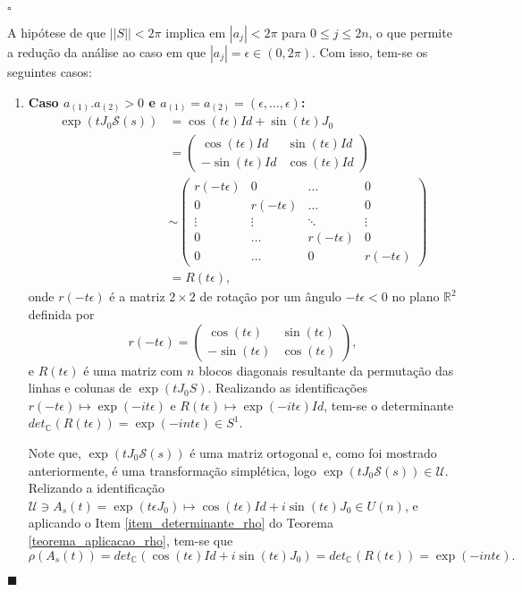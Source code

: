 \documentclass[12pt]{book}
\newenvironment{prova}[1]{$\square$ #1}{\hfill$\blacksquare$}
\newcommand{\circulo}{S^{1}}
\newcommand{\complexo}[1]{\mathbb{C}^{#1}}
\newcommand{\estruturacomplexa}{J_{0}}
\newcommand{\matrizSimpleticaOrtogonal}{\mathcal{U}}
\newcommand{\matrizunitaria}[1]{U(#1)}
\newcommand{\norma}[1]{||#1||}
\newcommand{\real}[1]{\mathbb{R}^{#1}}
\begin{document}
\begin{prova}
\begin{enumerate}
			A hipótese de que $\norma{S}<2\pi$ implica em $|a_{j}|<2\pi$ para $0\leq j \leq 2n$, o que permite a redução da análise ao caso em que  $|a_{j}|=\epsilon \in (0,2\pi)$. Com isso, tem-se os seguintes casos:
			\begin{enumerate}
				\item \textbf{Caso $a_{(1)}.a_{(2)}>0$ e $a_{(1)} = a_{(2)} = (\epsilon,\dots,\epsilon)$:}
				$$
				\begin{aligned}
				\exp(t\estruturacomplexa \mathcal{S}(s)) 
				&= 
				\cos(t\epsilon)Id+ \sin(t\epsilon)\estruturacomplexa
				\\
				&=	
				\left(
				\begin{array}{cc}
				\cos(t\epsilon)Id & \sin(t\epsilon)Id
				\\
				-\sin(t\epsilon)Id & \cos(t\epsilon)Id
				\end{array}
				\right)
				\\
				&\sim
				\left(
				\begin{array}{cccc}
				r(-t\epsilon) & 0 &\dots & 0
				\\
				0 & r(-t\epsilon) & \dots & 0
				\\
				\vdots & \vdots & \ddots & \vdots
				\\
				0 & \dots & r(-t\epsilon) & 0
				\\
				0 & \dots & 0 & r(-t\epsilon) 
				\end{array}
				\right)
				\\
				&=R(t\epsilon),
				\end{aligned}
				$$
				onde $r(-t\epsilon)$
				é a matriz $2\times 2$ de rotação por um ângulo $-t\epsilon <0$ no plano $\real{2}$ definida por
				$$
				r(-t\epsilon) = \left(
				\begin{array}{cc}
				\cos(t\epsilon) & \sin(t\epsilon)
				\\
				-\sin(t\epsilon) & \cos(t\epsilon)
				\end{array}
				\right),
				$$ 
				e $R(t\epsilon)$ é uma matriz com $n$ blocos diagonais resultante da permutação das linhas e colunas de $\exp(t\estruturacomplexa S)$. Realizando as identificações $r(-t\epsilon) \mapsto \exp(-it\epsilon)$ e $R(t\epsilon)\mapsto \exp(-it\epsilon)Id$, tem-se o determinante $det_{\complexo{}}(R(t\epsilon)) = \exp(-int\epsilon)\in \circulo$.
				
				Note que, $\exp(t\estruturacomplexa \mathcal{S}(s))$ é uma matriz ortogonal e, como foi mostrado anteriormente, é uma transformação simplética, logo $\exp(t\estruturacomplexa \mathcal{S}(s)) \in \matrizSimpleticaOrtogonal$. Relizando a identificação $\matrizSimpleticaOrtogonal\ni A_{s}(t)=\exp(t\epsilon\estruturacomplexa) \mapsto \cos(t\epsilon)Id+i\sin(t\epsilon)\estruturacomplexa\in \matrizunitaria{n}$, e aplicando o Item \ref{item_determinante_rho} do Teorema \ref{teorema_aplicacao_rho}, tem-se que 
				$$
				\rho(A_{s}(t)) = det_{\complexo{}}(\cos(t\epsilon)Id +i\sin(t\epsilon)\estruturacomplexa)=det_{\complexo{}}(R(t\epsilon)) = \exp(-int\epsilon).
				$$
				

\end{enumerate}
\end{enumerate}
\end{prova}
\end{document}
